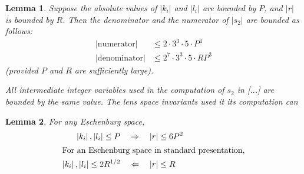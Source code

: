 \documentclass{article}
\newtheorem{lem}{Lemma}
\newcommand{\abs}[1]{\left|#1\right|}
\begin{document}
\begin{lem}\label{lem:s2}
  Suppose the absolute values of \(\abs{k_i}\) and \(\abs{l_i}\) are bounded by \(P\),
  and \(\abs{r}\) is bounded by \(R\). Then  the denominator and the numerator of \(\abs{s_2}\) are bounded as follows:
  \begin{align*}
    \abs{\text{numerator}}   &\leq 2·3^3·5·P^4\\
    \abs{\text{denominator}} &\leq 2^7·3^3·5· R P^3
  \end{align*}
  (provided \(P\) and \(R\) are sufficiently large).

  All intermediate integer variables used in the computation of \(s_2\) in [...] are bounded by the same value.  The lens space invariants used it its computation can 
\end{lem}
 
\begin{lem}\label{lem:P-vs-R}
  For any Eschenburg space, 
  \begin{align*}
    \abs{k_i}, \abs{l_i} \leq P &\quad\Rightarrow\quad \abs{r} \leq 6 P^2\\
    \intertext{%
    For an Eschenburg space in standard presentation,}
    \abs{k_i}, \abs{l_i} \leq 2R^{1/2} &\quad\Leftarrow\quad \abs{r} \leq R 
  \end{align*}
\end{lem}
\end{document}
